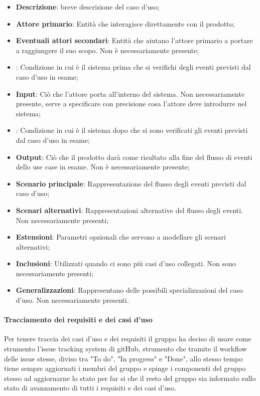 \documentclass[../norme-di-progetto.tex]{subfiles}
\begin{document}
\begin{itemize}
    \item \textbf{Descrizione}: breve descrizione del caso d'uso;
    \item \textbf{Attore primario}: Entità che interagisce direttamente con il prodotto;
    \item \textbf{Eventuali attori secondari}: Entità che aiutano l'attore primario a portare a raggiungere il suo scopo. Non è necessariamente presente;
    \item {}: Condizione in cui è il sistema prima che si verifichi degli eventi previsti dal caso d'uso in esame;
    \item \textbf{Input}: Ciò che l'attore porta all'interno del sistema. Non necessariamente presente, serve a specificare con precisione cosa l'attore deve introdurre nel sistema;
    \item {}: Condizione in cui è il sistema dopo che si sono verificati gli eventi previsti dal caso d'uso in esame;
    \item \textbf{Output}: Ciò che il prodotto darà come risultato alla fine del flusso di eventi dello use case in esame. Non è necessariamente presente;
    \item \textbf{Scenario principale}: Rappresentazione del flusso degli eventi previsti dal caso d'uso;
    \item \textbf{Scenari alternativi}: Rappresentazioni alternative del flusso degli eventi. Non necessariamente presenti;
    \item \textbf{Estensioni}: Parametri opzionali che servono a modellare gli scenari alternativi;
    \item \textbf{Inclusioni}: Utilizzati quando ci sono più casi d'uso collegati. Non sono necessariamente presenti;
    \item \textbf{Generalizzazioni}: Rappresentano delle possibili specializzazioni del caso d'uso. Non necessariamente presenti.
\end{itemize}


\paragraph{Tracciamento dei requisiti e dei casi d'uso}
Per tenere traccia dei casi d'uso e dei requisiti il gruppo ha deciso di usare come strumento l'issue tracking system di gitHub, strumento che tramite il workflow delle issue stesse, diviso tra "To do", "In progress" e "Done", allo stesso tempo tiene sempre aggiornati i membri del gruppo e spinge i componenti del gruppo stesso ad aggiornarne lo stato per far si che il resto del gruppo sia informato sullo stato di avanzamento di tutti i requisiti e dei casi d'uso.
\end{document}
